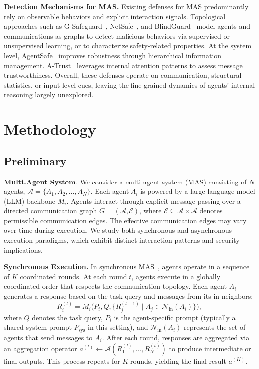 \documentclass{article}
\theoremstyle{plain}
\theoremstyle{definition}
\theoremstyle{remark}
\begin{document}
\noindent\textbf{Detection Mechanisms for MAS.}
Existing defenses for MAS predominantly rely on observable
behaviors and explicit interaction signals. Topological approaches such
as G-Safeguard~\cite{wang2025g}, NetSafe~\cite{yu2024netsafe}, and
BlindGuard~\cite{miao2025blindguard} model agents and communications as
graphs to detect malicious behaviors via supervised or unsupervised
learning, or to characterize safety-related properties. At the system
level, AgentSafe~\cite{mao2025agentsafe} improves robustness through
hierarchical information management. A-Trust~\cite{he2025attention}
leverages internal attention patterns to assess message trustworthiness. Overall, these defenses operate on
communication, structural statistics, or input-level cues, leaving the
fine-grained dynamics of agents’ internal reasoning largely unexplored.



\section{Methodology}



\subsection{Preliminary}

\noindent\textbf{Multi-Agent System.}
We consider a multi-agent system (MAS) consisting of $N$ agents,
$\mathcal{A} = \{A_1, A_2, \ldots, A_N\}$.
Each agent $A_i$ is powered by a large language model (LLM) backbone $M_i$.
Agents interact through explicit message passing over a directed communication
graph $G = (\mathcal{A}, \mathcal{E})$, where
$\mathcal{E} \subseteq \mathcal{A} \times \mathcal{A}$ denotes permissible
communication edges.
The effective communication edges may vary over time during execution.
We study both synchronous and asynchronous execution paradigms, which exhibit
distinct interaction patterns and security implications.

\noindent\textbf{Synchronous Execution.}
In synchronous MAS~\cite{wang2025g,miao2025blindguard}, agents operate in a 
sequence of $K$ coordinated rounds.
At each round $t$, agents execute in a globally coordinated order that respects
the communication topology.
Each agent $A_i$ generates a response based on the task query and messages from
its in-neighbors:
\begin{equation}
R_i^{(t)} = M_i\big(P_i, Q, \{R_j^{(t-1)} \mid A_j \in \mathcal{N}_{\text{in}}(A_i)\}\big),
\end{equation}
where $Q$ denotes the task query, $P_i$ is the agent-specific prompt 
(typically a shared system prompt $P_{\text{sys}}$ in this setting), 
and $\mathcal{N}_{\text{in}}(A_i)$ represents the set of agents that send 
messages to $A_i$.
After each round, responses are aggregated via an aggregation operator
$a^{(t)} \leftarrow \mathcal{A}(R_1^{(t)}, \ldots, R_N^{(t)})$ to produce
intermediate or final outputs.
This process repeats for $K$ rounds, yielding the final result $a^{(K)}$.
\end{document}
